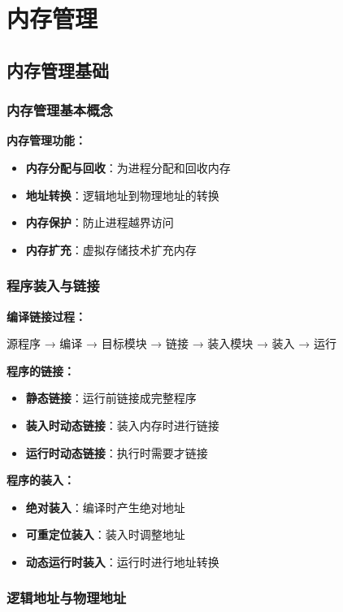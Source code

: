 \documentclass[lang=cn,newtx,10pt,scheme=chinese]{../../elegantbook}
\begin{document}
\chapter{内存管理}

\section{内存管理基础}

\subsection{内存管理基本概念}

\textbf{内存管理功能：}
\begin{itemize}
  \item \textbf{内存分配与回收}：为进程分配和回收内存
  \item \textbf{地址转换}：逻辑地址到物理地址的转换
  \item \textbf{内存保护}：防止进程越界访问
  \item \textbf{内存扩充}：虚拟存储技术扩充内存
\end{itemize}

\subsection{程序装入与链接}

\textbf{编译链接过程：}
\begin{center}
源程序 → 编译 → 目标模块 → 链接 → 装入模块 → 装入 → 运行
\end{center}

\textbf{程序的链接：}
\begin{itemize}
  \item \textbf{静态链接}：运行前链接成完整程序
  \item \textbf{装入时动态链接}：装入内存时进行链接
  \item \textbf{运行时动态链接}：执行时需要才链接
\end{itemize}

\textbf{程序的装入：}
\begin{itemize}
  \item \textbf{绝对装入}：编译时产生绝对地址
  \item \textbf{可重定位装入}：装入时调整地址
  \item \textbf{动态运行时装入}：运行时进行地址转换
\end{itemize}

\subsection{逻辑地址与物理地址}
\end{document}

